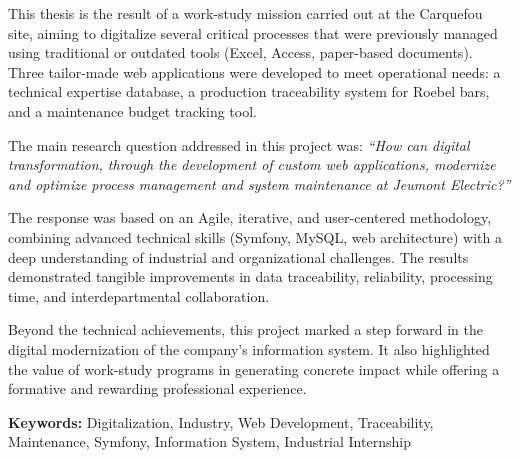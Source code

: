 \documentclass[11pt,a4paper]{article}
\begin{document}
This thesis is the result of a work-study mission carried out at the Carquefou site, aiming to digitalize several critical processes that were previously managed using traditional or outdated tools (Excel, Access, paper-based documents). Three tailor-made web applications were developed to meet operational needs: a technical expertise database, a production traceability system for Roebel bars, and a maintenance budget tracking tool.

The main research question addressed in this project was:
\textit{“How can digital transformation, through the development of custom web applications, modernize and optimize process management and system maintenance at Jeumont Electric?”}

The response was based on an Agile, iterative, and user-centered methodology, combining advanced technical skills (Symfony, MySQL, web architecture) with a deep understanding of industrial and organizational challenges. The results demonstrated tangible improvements in data traceability, reliability, processing time, and interdepartmental collaboration.

Beyond the technical achievements, this project marked a step forward in the digital modernization of the company’s information system. It also highlighted the value of work-study programs in generating concrete impact while offering a formative and rewarding professional experience.

\bigskip

\noindent\textbf{Keywords:} Digitalization, Industry, Web Development, Traceability, Maintenance, Symfony, Information System, Industrial Internship
\end{document}

